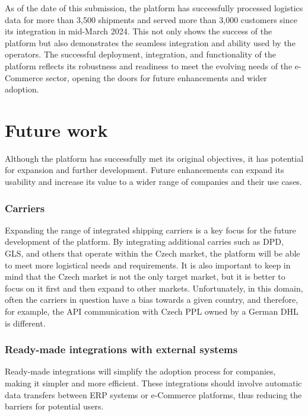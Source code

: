 As of the date of this submission, the platform has successfully processed logistics data for more than 3,500 shipments and served more than 3,000 customers since its integration in mid-March 2024.
This not only shows the success of the platform but also demonstrates the seamless integration and ability used by the operators.
The successful deployment, integration, and functionality of the platform reflects its robustness and readiness to meet the evolving needs of the e-Commerce sector, opening the doors for future enhancements and wider adoption.


\section*{Future work}
Although the platform has successfully  met its original objectives, it has potential for expansion and further development.
Future enhancements can expand its usability and increase its value to a wider range of companies and their use cases.

\subsubsection*{Carriers}
Expanding the range of integrated shipping carriers is a key focus for the future development of the platform.
By integrating additional carries such as DPD, GLS, and others that operate within the Czech market, the platform will be able to meet more logistical needs and requirements.
It is also important to keep in mind that the Czech market is not the only target market, but it is better to focus on it first and then expand to other markets. 
Unfortunately, in this domain, often the carriers in question have a bias towards a given country, and therefore, for example, the API communication with Czech PPL owned by a German DHL is different.

\subsubsection*{Ready-made integrations with external systems}
Ready-made integrations will simplify the adoption process for companies, making it simpler and more efficient. 
These integrations should involve automatic data transfers between ERP systems or e-Commerce platforms, thus reducing the barriers for potential users.

